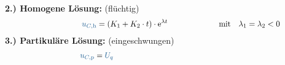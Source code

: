 \begin{frame}[t]
\begin{align*}
\end{align*}%
\pause%
\textbf{2.) Homogene Lösung:} (flüchtig)
\begin{align}
    &&
        \ecv{u_{C,\mathrm{h}}} &= \left( K_1 + K_2 \cdot t \right) \cdot \mathrm{e}^{\lambda t}
    &&\text{mit}\quad \lambda_1 = \lambda_2 < 0  \label{eq:dgl:rlc:homolsg:grenzfall}
    \\[-15pt] &\hphantom{1rrrrrrrrrrrrrrrr} &   \hphantom{2llllll}&\hphantom{\mathrel{\phantom{=}}2rrrrrrrrrrrrrrrrrrrrrrrrrrr}     &&\hphantom{3rrrrrrrrrrrrrrrrrrrrrrrr} \nonumber
\end{align}%
\textbf{3.) Partikuläre Lösung:} (eingeschwungen)%
\begin{align*}
    &&
        \ecv{u_{C,\mathrm{p}}} &= \ecv{U_q}
    \\[-15pt] &\hphantom{1rrrrrrrrrrrrrrrr} &   \hphantom{2llllll}&\hphantom{\mathrel{\phantom{=}}2rrrrrrrrrrrrrrrrrrrrrrrrrrr}     &&\hphantom{3rrrrrrrrrrrrrrrrrrrrrrrr} \nonumber
    \end{align*}
\end{frame}


